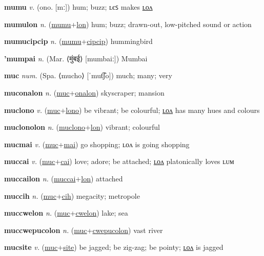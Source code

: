 \textbf{\hypertarget{mumu}{mumu}} \textit{v.} (ono. [mː])
hum; buzz; ʟєꜱ makes \hyperlink{mumulon}{ʟᴏᴧ}

\textbf{\hypertarget{mumulon}{mumulon}} \textit{n.} (\hyperlink{mumu}{mumu}+\allowbreak \hyperlink{lon}{lon})
hum; buzz; drawn-out, low-pitched sound or action

\textbf{\hypertarget{mumucipcip}{mumucipcip}} \textit{n.} (\hyperlink{mumu}{mumu}+\allowbreak \hyperlink{cipcip}{cipcip})
hummingbird

\textbf{\hypertarget{'mumpai}{'mumpai}} \textit{n.} (Mar. ⟨{\devanagari{}मुंबई}⟩ [mumbaiː])
Mumbai

\textbf{\hypertarget{muc}{muc}} \textit{num.} (Spa. ⟨mucho⟩ [ˈmut͡ʃo])
much; many; very

\textbf{\hypertarget{muconalon}{muconalon}} \textit{n.} (\hyperlink{muc}{muc}+\allowbreak \hyperlink{onalon}{onalon})
skyscraper; mansion

\textbf{\hypertarget{muclono}{muclono}} \textit{v.} (\hyperlink{muc}{muc}+\allowbreak \hyperlink{lono}{lono})
be vibrant; be colourful; \hyperlink{muclonolon}{ʟᴏᴧ} has many hues and colours

\textbf{\hypertarget{muclonolon}{muclonolon}} \textit{n.} (\hyperlink{muclono}{muclono}+\allowbreak \hyperlink{lon}{lon})
vibrant; colourful

\textbf{\hypertarget{mucmai}{mucmai}} \textit{v.} (\hyperlink{muc}{muc}+\allowbreak \hyperlink{mai}{mai})
go shopping; ʟᴏᴧ is going shopping

\textbf{\hypertarget{muccai}{muccai}} \textit{v.} (\hyperlink{muc}{muc}+\allowbreak \hyperlink{cai}{cai})
love; adore; be attached; \hyperlink{muccailon}{ʟᴏᴧ} platonically loves ʟᴜᴍ

\textbf{\hypertarget{muccailon}{muccailon}} \textit{n.} (\hyperlink{muccai}{muccai}+\allowbreak \hyperlink{lon}{lon})
attached

\textbf{\hypertarget{muccih}{muccih}} \textit{n.} (\hyperlink{muc}{muc}+\allowbreak \hyperlink{cih}{cih})
megacity; metropole

\textbf{\hypertarget{muccwelon}{muccwelon}} \textit{n.} (\hyperlink{muc}{muc}+\allowbreak \hyperlink{cwelon}{cwelon})
lake; sea

\textbf{\hypertarget{muccwepucolon}{muccwepucolon}} \textit{n.} (\hyperlink{muc}{muc}+\allowbreak \hyperlink{cwepucolon}{cwepucolon})
vast river

\textbf{\hypertarget{mucsite}{mucsite}} \textit{v.} (\hyperlink{muc}{muc}+\allowbreak \hyperlink{site}{site})
be jagged; be zig-zag; be pointy; \hyperlink{mucsitelon}{ʟᴏᴧ} is jagged

